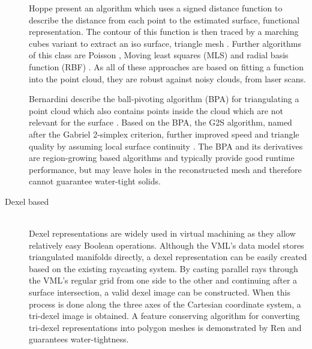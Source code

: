 \begin{description}
	Hoppe \etal present an algorithm which uses a signed distance function to describe the distance from each point to the estimated surface, \ie functional representation.
	The contour of this function is then traced by a marching cubes variant to extract an iso surface, \ie triangle mesh \cite{sdf_surface_reconstruction}.
	Further algorithms of this class are Poisson \cite{poisson}, Moving least squares (MLS) \cite{mls} and radial basis function (RBF) \cite{rbf}.
	As all of these approaches are based on fitting a function into the point cloud, they are robust against noisy clouds, \eg from laser scans.

	Bernardini \etal describe the ball-pivoting algorithm (BPA) for triangulating a point cloud which also contains points inside the cloud which are not relevant for the surface \cite{bpa}.
	Based on the BPA, the G2S algorithm, named after the Gabriel 2-simplex criterion, further improved speed and triangle quality by assuming local surface continuity \cite{g2s}.
	The BPA and its derivatives are region-growing based algorithms and typically provide good runtime performance, but may leave holes in the reconstructed mesh and therefore cannot guarantee water-tight solids.


	\item[Dexel based] \hfill \\
	Dexel representations are widely used in virtual machining as they allow  relatively easy Boolean operations.
	Although the VML's data model stores triangulated manifolds directly, a dexel representation can be easily created based on the existing raycasting system.
	By casting parallel rays through the VML's regular grid from one side to the other and continuing after a surface intersection, a valid dexel image can be constructed.
	When this process is done along the three axes of the Cartesian coordinate system, a tri-dexel image is obtained.
	A feature conserving algorithm for converting tri-dexel representations into polygon meshes is demonstrated by Ren \etal \cite{tridexel_reconstruction} and guarantees water-tightness.



\end{description}
